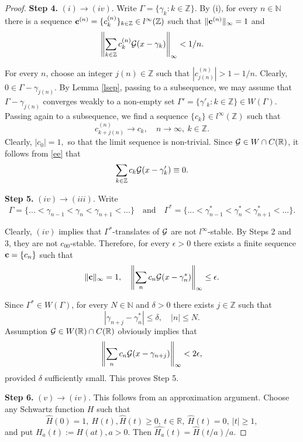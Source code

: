 \documentclass[12pt]{amsart}
\numberwithin{equation}{section}
\newcommand{\R}{{\mathbb R}} \newcommand{\Q}{{\mathbb Q}} \newcommand{\Z}{{\mathbb Z}} \newcommand{\N}{{\mathbb N}}
\begin{document}
\begin{proof}
{\noindent \bf Step 4.} 
$(i)\rightarrow (iv)$.  Write $\Gamma=\{\gamma_k:k\in\Z\}$.
    By (i), for every $n\in\N$ there is a  sequence  ${\bf c}^{(n)}=
    \{c^{(n)}_{k}\}_{k\in\Z}\in l^\infty(\Z)$ such that $\|{\bf c}^{(n)}\|_\infty=1$ and 
    \begin{equation}\label{ee}
    \left\|\sum\limits_{k\in\Z} c^{(n)}_{k} \Ff(x - \gamma_k)\right\|_{\infty} < 1 /n.
    \end{equation}
    
    For every $n$, choose an integer $j(n)\in\Z$ such that $|c^{(n)}_{j(n)}|>1-1/n$.
    Clearly,  $0\in \Gamma -\gamma_{j(n)}.$     
    By Lemma \ref{lsep}, passing to a subsequence, we may assume that
$\Gamma - \gamma_{j(n)}$ converges weakly to a non-empty set $ \Gamma'=\{\gamma'_k:k\in\Z\} \in W(\Gamma)$. Passing again to a subsequence, we find  a sequence $\{c_k\}\in l^\infty(\Z)$ such that   $$c_{k+j(n)}^{(n)}\to c_k,\quad n\to\infty, \ k\in\Z.
$$Clearly,  $|c_0|=1,$ so that the limit sequence is non-trivial.
Since $\Ff\in W\cap C(\R)$, it follows from \eqref{ee} that 
$$ \sum\limits_{k\in\Z} c_{k} \Ff(x - \gamma_k')\equiv 0.$$ 

{\bf \noindent Step 5.} $(iv)\rightarrow (iii)$.
Write $$\Gamma=\{...<\gamma_{n-1}<\gamma_n<\gamma_{n+1}<...\} \quad  \text{and} \quad  
\Gamma^\ast=\{...<\gamma^\ast_{n-1}<\gamma^\ast_n<\gamma^\ast_{n+1}<...\}.$$ 

Clearly,  $(iv)$ implies that $\Gamma^\ast$-translates of $\mathcal{G}$ are not $l^\infty$-stable. By Steps 2 and 3, 
they are not $c_{00}$-stable. Therefore, for every $\epsilon>0$ there exists a finite sequence ${\bf c}=\{c_n\}$ such that
$$\|{\bf c}\|_\infty=1,\quad \left\|\sum_{n}c_{n}\mathcal{G}(x-\gamma^\ast_n)\right\|_\infty\leq\epsilon.$$

Since $\Gamma^\ast\in W(\Gamma)$, for every $N\in\N$ and $\delta>0$ there exists $j\in \Z$ such that
$$|\gamma_{n+j}-\gamma^\ast_n|\leq\delta,\quad |n|\leq N.$$ Assumption $\Ff\in W(\R)\cap C(\R)$ obviously
implies that
$$\left\|\sum_{n}c_n\mathcal{G}(x-\gamma_{n+j})\right\|_\infty<2\epsilon,$$provided  $\delta$ sufficiently small. This proves  Step 5.

{\bf \noindent Step 6.} $(v)\rightarrow (iv)$. This follows from an approximation argument.
Choose any Schwartz function $H$ such that \begin{equation}\label{eh}\hat H(0)=1, \ H(t), \hat H(t)\geq 0,\ t\in\R, \ \hat H(t)=0, \ |t|\geq 1, \end{equation}and put $H_a(t):=H(at), a>0.$ Then $\widehat{H_a}(t)=\hat H(t/a)/a.$


\end{proof}
\end{document}
